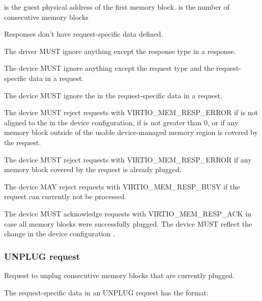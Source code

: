  is the guest physical address of the first memory block.
 is the number of consecutive memory blocks

Responses don't have request-specific data defined.


The driver MUST ignore anything except the response type in a response.


The device MUST ignore anything except the request type and the
request-specific data in a request.

The device MUST ignore the  in the request-specific data in
a request.

The device MUST reject requests with VIRTIO_MEM_RESP_ERROR if 
is not aligned to the  in the device configuration, if
 is not greater than 0, or if any memory block outside of
the usable device-managed memory region is covered by the request.

The device MUST reject requests with VIRTIO_MEM_RESP_ERROR if any memory
block covered by the request is already plugged.

The device MAY reject requests with VIRTIO_MEM_RESP_BUSY if the request can
currently not be processed.

The device MUST acknowledge requests with VIRTIO_MEM_RESP_ACK in case all
memory blocks were successfully plugged.  The device MUST reflect the
change in the device configuration .

\subsubsection{UNPLUG request}\label{sec:Device Types / Memory Device / Device Operation / UNPLUG request}

Request to unplug consecutive memory blocks that are currently plugged.

The request-specific data in an UNPLUG request has the format:


